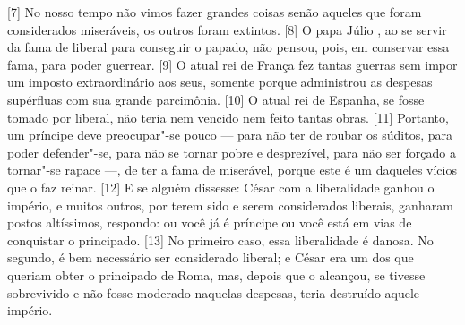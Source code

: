 {[}7{]} No nosso tempo não vimos fazer grandes coisas senão aqueles que
foram considerados miseráveis, os outros foram extintos. {[}8{]} O papa
Júlio , ao se servir da fama de liberal para conseguir o papado, não
pensou, pois, em conservar essa fama, para poder guerrear. {[}9{]} O
atual rei de França fez
tantas guerras sem impor um imposto extraordinário aos seus, somente
porque administrou as despesas supérfluas com sua grande parcimônia.
{[}10{]} O atual rei de Espanha, se
fosse tomado por liberal, não teria nem vencido nem feito tantas obras.
{[}11{]} Portanto, um príncipe deve preocupar"-se pouco --- para não ter
de roubar os súditos, para poder defender"-se, para não se tornar pobre e
desprezível, para não ser forçado a tornar"-se rapace ---, de ter a fama
de miserável, porque este é um daqueles vícios que o faz reinar.
{[}12{]} E se alguém dissesse: César com a liberalidade ganhou o império, e muitos outros, por terem
sido e serem considerados liberais, ganharam postos altíssimos,
respondo: ou você já é príncipe ou você está em vias de conquistar o
principado. {[}13{]} No primeiro caso, essa liberalidade é danosa. No
segundo, é bem necessário ser considerado liberal; e César era um dos
que queriam obter o principado de Roma, mas, depois que o alcançou, se
tivesse sobrevivido e não fosse moderado naquelas despesas, teria
destruído aquele império.

